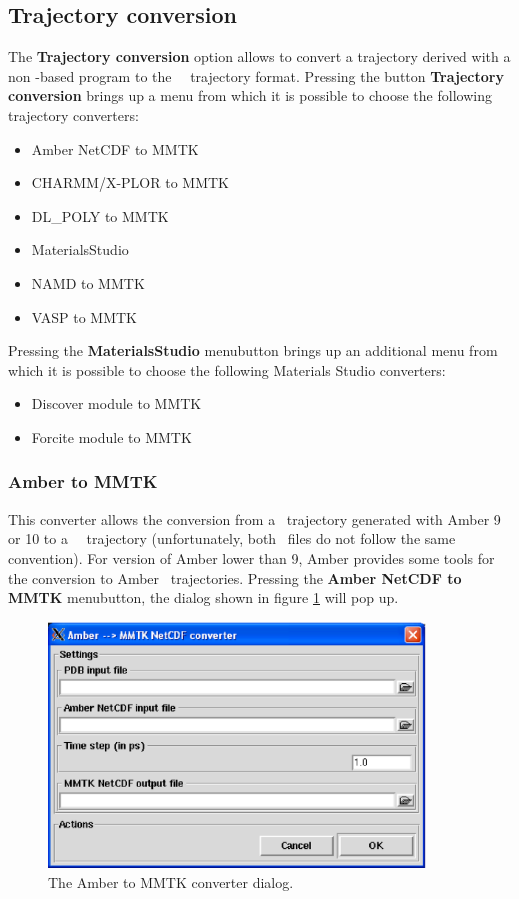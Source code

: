 \documentclass[a4paper,11pt]{report}
\begin{document}
\subsection{Trajectory conversion}
\label{trajectory_conversion}
The \textbf{Trajectory conversion} option allows to convert a trajectory derived with a non \MMTK -based program to the \NetCDF\ \MMTK\ 
trajectory format. Pressing the button \textbf{Trajectory conversion} brings up a menu from which it is possible to choose 
the following trajectory converters:
\begin{itemize}
\item Amber NetCDF to MMTK
\item CHARMM/X-PLOR to MMTK
\item DL\_POLY to MMTK
\item MaterialsStudio
\item NAMD to MMTK
\item VASP to MMTK
\end{itemize}
Pressing the \textbf{MaterialsStudio} menubutton brings up an additional menu from which it is possible to choose the 
following Materials Studio converters:
\begin{itemize}
\item Discover module to MMTK
\item Forcite module to MMTK
\end{itemize}

\subsubsection{Amber to MMTK}
\label{amber_to_mmtk}
This converter allows the conversion from a \NetCDF\ trajectory generated with Amber 9 or 10 \cite{Amber} to a \MMTK\ \NetCDF\ trajectory 
(unfortunately, both \NetCDF\ files do not follow the same convention). For version of Amber lower than 9, Amber provides some tools 
for the conversion to Amber \NetCDF\ trajectories. Pressing the \textbf{Amber NetCDF to MMTK} menubutton, the dialog shown in 
figure \ref{fig:amber_converter} will pop up.
\newpage
\begin{figure}[h!]
\begin{center}
\includegraphics[width=10cm]{Figures/amber_converter.eps}
\end{center}
\caption[The Amber to MMTK converter dialog]{The Amber to MMTK converter dialog.}
\label{fig:amber_converter}
\end{figure}   
\end{document}
